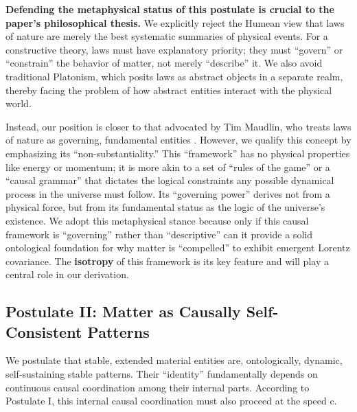 \documentclass[11pt, a4paper]{article}
\begin{document}
\textbf{Defending the metaphysical status of this postulate is crucial to the paper's philosophical thesis.} We explicitly reject the Humean view that laws of nature are merely the best systematic summaries of physical events. For a constructive theory, laws must have explanatory priority; they must ``govern'' or ``constrain'' the behavior of matter, not merely ``describe'' it. We also avoid traditional Platonism, which posits laws as abstract objects in a separate realm, thereby facing the problem of how abstract entities interact with the physical world.

Instead, our position is closer to that advocated by Tim Maudlin, who treats laws of nature as governing, fundamental entities \cite{Maudlin2007}. However, we qualify this concept by emphasizing its ``non-substantiality.'' This ``framework'' has no physical properties like energy or momentum; it is more akin to a set of ``rules of the game'' or a ``causal grammar'' that dictates the logical constraints any possible dynamical process in the universe must follow. Its ``governing power'' derives not from a physical force, but from its fundamental status as the logic of the universe's existence. We adopt this metaphysical stance because only if this causal framework is ``governing'' rather than ``descriptive'' can it provide a solid ontological foundation for why matter is ``compelled'' to exhibit emergent Lorentz covariance. The \textbf{isotropy} of this framework is its key feature and will play a central role in our derivation.

\subsection{Postulate II: Matter as Causally Self-Consistent Patterns}
We postulate that stable, extended material entities are, ontologically, dynamic, self-sustaining stable patterns. Their ``identity'' fundamentally depends on continuous causal coordination among their internal parts. According to Postulate I, this internal causal coordination must also proceed at the speed c.
\end{document}
